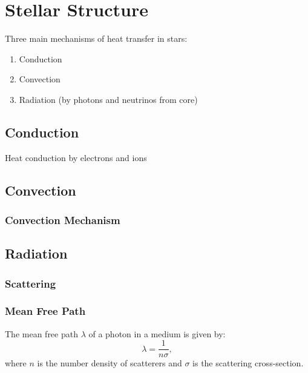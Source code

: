 \chapter{Stellar Structure}


Three main mechanisms of heat transfer in stars:
\begin{enumerate}
    \item Conduction
    \item Convection
    \item Radiation (by photons and neutrinos from core)
\end{enumerate}

\section{Conduction}

Heat conduction by electrons and ions

\section{Convection}
\subsection{Convection Mechanism}

\section{Radiation}
\subsection{Scattering}

\subsection{Mean Free Path}
\begin{theory}
The mean free path $\lambda$ of a photon in a medium is given by:
\begin{equation}
    \lambda = \frac{1}{n\sigma},
\end{equation}
where $n$ is the number density of scatterers and $\sigma$ is the scattering cross-section.
\end{theory}


